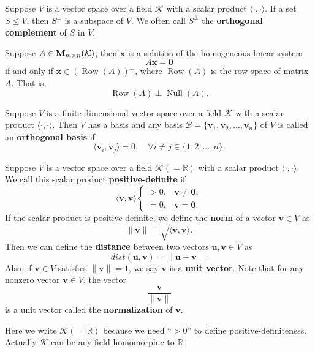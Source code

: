 	\begin{propositionenv}
		Suppose $V$ is a vector space over a field $\mathcal{K}$ with a scalar product $\langle \cdot, \cdot \rangle$. If a set $S \le V$, then $S^\perp$ is a subspace of $V$. We often call $S^\perp$ the \textbf{orthogonal complement} of $S$ in $V$.
	\end{propositionenv}
	\begin{exampleenv}
		Suppose $A\in \mathbf{M}_{m \times n}(\mathcal{K})$, then $\bm{x}$ is a solution of the homogeneous linear system
		\[
		A\bm{x} = \bm{0}
		\]
		if and only if $\bm{x} \in (\operatorname{Row}(A))^\perp$, where $\operatorname{Row}(A)$ is the row space of matrix $A$. That is,
		\[
		\operatorname{Row}(A) \perp \operatorname{Null}(A).
		\]
	\end{exampleenv}
	\begin{definitionenv}
		Suppose $V$ is a finite-dimensional vector space over a field $\mathcal{K}$ with a scalar product $\langle \cdot, \cdot \rangle$. Then $V$ has a basis and any basis $\mathcal{B} = \{\bm{v}_1, \bm{v}_2, \dots, \bm{v}_n\}$ of $V$ is called an \textbf{orthogonal basis} if
		\[
		\langle \bm{v}_i, \bm{v}_j \rangle = 0, \quad \forall i \neq j\in \{1,2,\ldots,n\}.
		\]

	\end{definitionenv}
	\begin{definitionenv}
		Suppose $V$ is a vector space over a field $\mathcal{K\left( =\mathbb{R} \right)}$ with a scalar product $\langle \cdot, \cdot \rangle$. We call this scalar product \textbf{positive-definite} if
		\[
		\langle \bm{v}, \bm{v} \rangle 
		\begin{cases}
		> 0, & \bm{v} \neq \bm{0}, \\
		= 0, & \bm{v} = \bm{0}.
		\end{cases}
		\]
		If the scalar product is positive-definite, we define the \textbf{norm} of a vector $\bm{v} \in V$ as
		\[
		\| \bm{v} \| = \sqrt{\langle \bm{v}, \bm{v} \rangle}.
		\]
		Then we can define the \textbf{distance} between two vectors $\bm{u}, \bm{v} \in V$ as
		\[
		dist(\bm{u}, \bm{v}) = \| \bm{u} - \bm{v} \|.
		\]
		Also, if $\bm{v} \in V$ satisfies $\| \bm{v} \| = 1$, we say $\bm{v}$ is a \textbf{unit vector}. Note that for any nonzero vector $\bm{v} \in V$, the vector
		\[
		\frac{\bm{v}}{\| \bm{v} \|}
		\]
		is a unit vector called the \textbf{normalization} of $\bm{v}$.
	\end{definitionenv}
	\begin{remarkenv}
		Here we write $\mathcal{K} \left(= \mathbb{R}\right)$ because we need ``$>0$'' to define positive-definiteness. Actually $\mathcal{K}$ can be any field homomorphic to $\mathbb{R}$. 
	\end{remarkenv}
